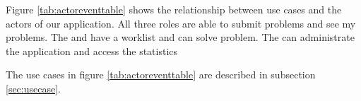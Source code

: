 


Figure \ref{tab:actoreventtable} shows the relationship between use cases and the actors of our application.
All three roles are able to submit problems and see my problems.
The \astaff[] and \admin[] have a worklist and can solve problem. The \admin[] can administrate the application and access the statistics

The use cases in figure \ref{tab:actoreventtable} are described in subsection \ref{sec:usecase}.


